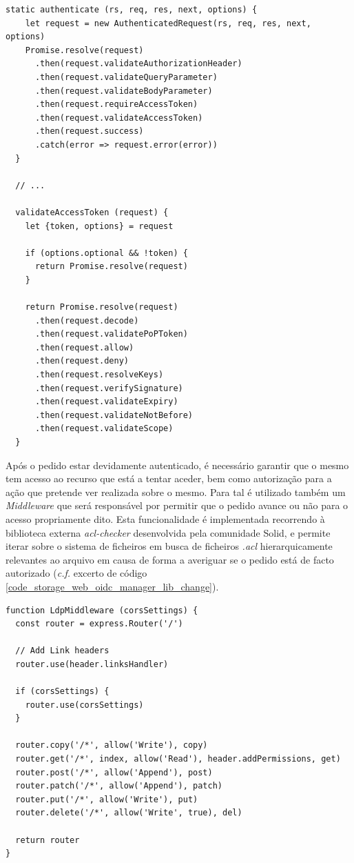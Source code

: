 \begin{lstlisting}[caption={Camada de validação do pedido e do token de acesso na biblioteca \emph{oidc-rs}}, label={code_storage_web_validacao_pedido_e_token}]
  static authenticate (rs, req, res, next, options) {
    let request = new AuthenticatedRequest(rs, req, res, next, options)
    Promise.resolve(request)
      .then(request.validateAuthorizationHeader)
      .then(request.validateQueryParameter)
      .then(request.validateBodyParameter)
      .then(request.requireAccessToken)
      .then(request.validateAccessToken)
      .then(request.success)
      .catch(error => request.error(error))
  }
  
  // ...

  validateAccessToken (request) {
    let {token, options} = request

    if (options.optional && !token) {
      return Promise.resolve(request)
    }

    return Promise.resolve(request)
      .then(request.decode)
      .then(request.validatePoPToken)
      .then(request.allow)
      .then(request.deny)
      .then(request.resolveKeys)
      .then(request.verifySignature)
      .then(request.validateExpiry)
      .then(request.validateNotBefore)
      .then(request.validateScope)
  }

\end{lstlisting}

Após o pedido estar devidamente autenticado, é necessário garantir que o mesmo tem acesso ao recurso que está a tentar aceder, bem como autorização para a ação que pretende ver realizada sobre o mesmo. Para tal é utilizado também um \emph{Middleware} que será responsável por permitir que o pedido avance ou não para o acesso propriamente dito.
Esta funcionalidade é implementada recorrendo à biblioteca externa \emph{acl-checker} desenvolvida pela comunidade Solid, e permite iterar sobre o sistema de ficheiros em busca de ficheiros \emph{.acl} hierarquicamente relevantes ao arquivo em causa de forma a averiguar se o pedido está de facto autorizado (\emph{c.f.} excerto de código \ref{code_storage_web_oidc_manager_lib_change}).

\begin{lstlisting}[caption={Alteração ao \emph{OIDCManager} na biblioteca \emph{oidc-auth-manager}}, label={code_storage_web_oidc_manager_lib_change}]
function LdpMiddleware (corsSettings) {
  const router = express.Router('/')

  // Add Link headers
  router.use(header.linksHandler)

  if (corsSettings) {
    router.use(corsSettings)
  }

  router.copy('/*', allow('Write'), copy)
  router.get('/*', index, allow('Read'), header.addPermissions, get)
  router.post('/*', allow('Append'), post)
  router.patch('/*', allow('Append'), patch)
  router.put('/*', allow('Write'), put)
  router.delete('/*', allow('Write', true), del)

  return router
}

\end{lstlisting}

